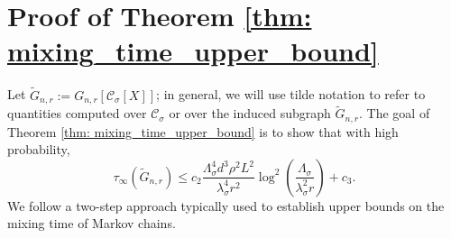 \documentclass[11pt,twoside]{article}
\theoremstyle{definition}
\newcommand{\vol}{\mathrm{vol}}
\newcommand{\cut}{\mathrm{cut}}
\newcommand{\1}{\mathbbm{1}}
\newcommand{\Err}{\mathrm{Err}}
\newcommand{\Xbf}{X}
\newcommand{\Pbb}{\mathbb{P}}
\newcommand{\Cset}{\mathcal{C}}
\newcommand{\Csig}{\Cset_{\sigma}}
\begin{document}

\section{Proof of Theorem \ref{thm: mixing_time_upper_bound}}

Let $\widetilde{G}_{n,r} := G_{n,r}[\Csig[\Xbf]]$; in general, we will use tilde notation to refer to quantities computed over $\Csig$ or over the induced subgraph $\widetilde{G}_{n,r}$. The goal of Theorem \ref{thm: mixing_time_upper_bound} is to show that with high probability,
\begin{equation*}
\tau_{\infty}(\widetilde{G}_{n,r}) \leq c_2 \frac{\Lambda_{\sigma}^4 d^3 \rho^2 L^2}{\lambda_{\sigma}^4 r^2} \log^2\left(\frac{ \Lambda_{\sigma}}{\lambda_{\sigma}^2 r}\right) + c_3.
\end{equation*}
We follow a two-step approach typically used to establish upper bounds on the mixing time of Markov chains. 
\end{document}
